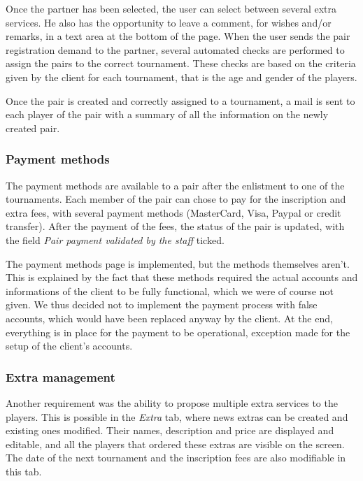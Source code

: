 Once the partner has been selected, the user can select between several extra
services. He also has the opportunity to leave a comment, for wishes and/or
remarks, in a text area at the bottom of the page. When the user sends the
pair registration demand to the partner, several automated checks are performed
to assign the pairs to the correct tournament. These checks are based
on the criteria given by the client for each tournament, that is the age and
gender of the players. \newline

Once the pair is created and correctly assigned to a tournament, a mail
is sent to each player of the pair with a summary of all the information on the
newly created pair.

\subsubsection{Payment methods}
\label{subs:Payment methods}


The payment methods are available to a pair after the enlistment to one of the
tournaments. Each member of the pair can chose to pay for the inscription and
extra fees, with several payment methods (MasterCard, Visa, Paypal or credit
transfer). After the payment of the fees, the status of the pair is updated,
with the field \textit{Pair payment validated by the staff} ticked.\newline

The payment methods page is implemented, but the methods themselves aren't.
This is explained by the fact that these methods required the actual accounts
and informations of the client to be fully functional, which we were of course
not given. We thus decided not to implement the payment process with false
accounts, which would have been replaced anyway by the client. At the end,
everything is in place for the payment to be operational, exception made for
the setup of the client's accounts.

\subsubsection{Extra management}
\label{subs:Extra management}


Another requirement was the ability to propose multiple extra services to the
players. This is possible in the \textit{Extra} tab, where news extras can be
created and existing ones modified. Their names, description and price are
displayed and editable, and all the players that ordered these extras are
visible on the screen. The date of the next tournament and the inscription fees
are also modifiable in this tab.

